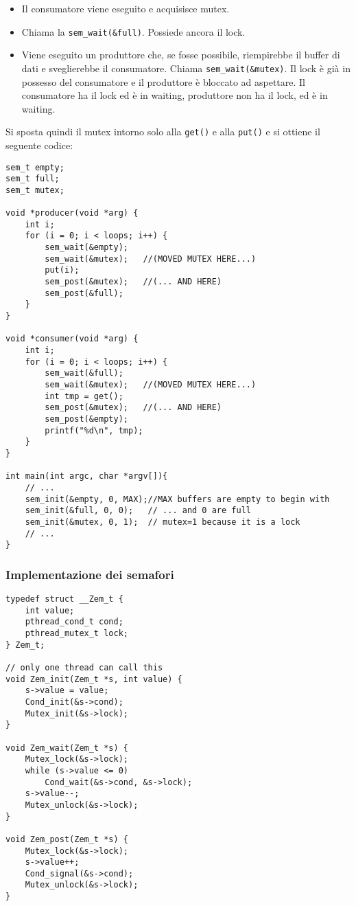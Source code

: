 \documentclass[12pt, twoside, letterpaper]{article}
\begin{document}
				\begin{itemize}
					\item Il consumatore viene eseguito e acquisisce mutex. 
					\item Chiama la \texttt{sem\_wait(\&full)}. Possiede ancora il lock.
					\item Viene eseguito un produttore che, se fosse possibile, riempirebbe il buffer di dati e sveglierebbe il consumatore. Chiama \texttt{sem\_wait(\&mutex)}. Il lock è già in possesso del consumatore e il produttore è bloccato ad aspettare. Il consumatore ha il lock ed è in waiting, produttore non ha il lock, ed è in waiting.
				\end{itemize}
				Si sposta quindi il mutex intorno solo alla \texttt{get()} e alla \texttt{put()} e si ottiene il seguente codice: 
				\begin{lstlisting}[style=CStyle]
sem_t empty;
sem_t full;
sem_t mutex;

void *producer(void *arg) {
	int i;
	for (i = 0; i < loops; i++) {
		sem_wait(&empty);
		sem_wait(&mutex);	//(MOVED MUTEX HERE...)
		put(i);
		sem_post(&mutex);	//(... AND HERE)
		sem_post(&full);
	}
}

void *consumer(void *arg) {
	int i;
	for (i = 0; i < loops; i++) {
		sem_wait(&full);
		sem_wait(&mutex);	//(MOVED MUTEX HERE...)
		int tmp = get();
		sem_post(&mutex);	//(... AND HERE)
		sem_post(&empty);
		printf("%d\n", tmp);
	}
}

int main(int argc, char *argv[]){
	// ...
	sem_init(&empty, 0, MAX);//MAX buffers are empty to begin with
	sem_init(&full, 0, 0);   // ... and 0 are full
	sem_init(&mutex, 0, 1);  // mutex=1 because it is a lock
	// ...
}				\end{lstlisting}
			\subsubsection{Implementazione dei semafori}
				\begin{lstlisting}[style=CStyle]
typedef struct __Zem_t {
	int value;
	pthread_cond_t cond;
	pthread_mutex_t lock;
} Zem_t;

// only one thread can call this
void Zem_init(Zem_t *s, int value) {
	s->value = value;
	Cond_init(&s->cond);
	Mutex_init(&s->lock);
}

void Zem_wait(Zem_t *s) {
	Mutex_lock(&s->lock);
	while (s->value <= 0)
		Cond_wait(&s->cond, &s->lock);
	s->value--;
	Mutex_unlock(&s->lock);
}

void Zem_post(Zem_t *s) {
	Mutex_lock(&s->lock);
	s->value++;
	Cond_signal(&s->cond);
	Mutex_unlock(&s->lock);
}				\end{lstlisting}
\end{document}
